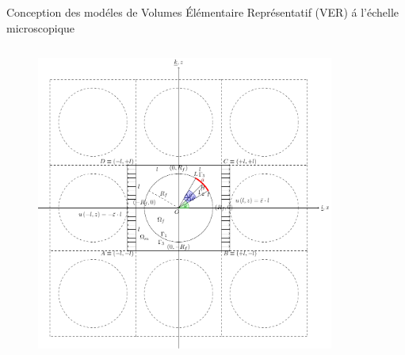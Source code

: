 \documentclass[final]{beamer}
\begin{document}
\begin{frame}
\begin{center}
\begin{minipage}{\textwidth}
\begin{exampleblock}{\rule[-0.6ex]{0pt}{50pt}\centering\LARGE Conception des mod\'eles de Volumes \'El\'ementaire Repr\'esentatif (VER) \'a l'\'echelle microscopique}
\begin{columns}
\begin{column}{0.15\textwidth}
\begin{figure}[!h]
   \includegraphics[width=\columnwidth]{periodicRVE_cc.pdf}
\end{figure}
\end{column}
\begin{column}{0.2\textwidth}  %
    \begin{center}
\captionsetup[subfigure]{labelformat=empty}
\begin{figure}[!h]
\centering
    \\

\end{figure}
\end{center}
\end{column}
\end{columns}
\end{exampleblock}
\end{minipage}
\end{center}
\end{frame}
\end{document}
